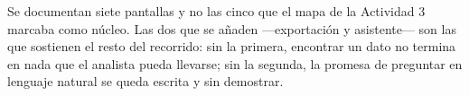 Se documentan siete pantallas y no las cinco que el mapa de la Actividad 3 marcaba como núcleo. Las
dos que se añaden ---exportación y asistente--- son las que sostienen el resto del recorrido: sin la
primera, encontrar un dato no termina en nada que el analista pueda llevarse; sin la segunda, la
promesa de preguntar en lenguaje natural se queda escrita y sin demostrar.
